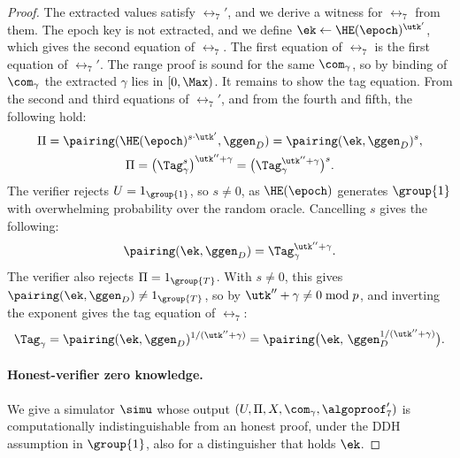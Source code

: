 \begin{proof}
  The extracted values satisfy $\rel_7'$, and we derive a witness for $\rel_7$
from them. The epoch key is not extracted, and we define $\ek \leftarrow
\HE(\epoch)^{\utk'}$, which gives the second equation of $\rel_7$. The first
equation of $\rel_7$ is the first equation of $\rel_7'$. The range proof is
sound for the same $\com_\gamma$, so by binding of $\com_\gamma$ the extracted
$\gamma$ lies in $[0,\Max)$. It remains to show the tag equation. From the
second and third equations of $\rel_7'$, and from the fourth and fifth, the
following hold:
  \begin{gather*}
    \Pi = \pairing(\HE(\epoch)^{s\cdot\utk'},\ggen_D) = \pairing(\ek,
\ggen_D)^{s}, \\ \Pi = \big(\Tag_\gamma^{s}\big)^{\utk''+\gamma} =
\big(\Tag_\gamma^{\utk''+\gamma}\big)^{s}.
  \end{gather*}
  The verifier rejects $U = 1_{\group{1}}$, so $s \neq 0$, as $\HE(\epoch)$
generates $\group{1}$ with overwhelming probability over the random oracle.
Cancelling $s$ gives the following:
  \begin{equation}\label{eq:rel7prime-core}
    \pairing(\ek, \ggen_D) = \Tag_\gamma^{\utk''+\gamma}.
  \end{equation}
  The verifier also rejects $\Pi = 1_{\group{T}}$. With $s \neq 0$, this gives
$\pairing(\ek,\ggen_D) \neq 1_{\group{T}}$, so by 
$\utk'' + \gamma \neq 0 \bmod p$, and inverting the exponent gives the tag
equation of $\rel_7$:
  \begin{equation*}
    \Tag_\gamma = \pairing(\ek,\ggen_D)^{1/(\utk''+\gamma)} =
\pairing\big(\ek,\, \ggen_D^{1/(\utk''+\gamma)}\big).
  \end{equation*}

  \paragraph{Honest-verifier zero knowledge.} We give a simulator $\simu$ whose
output $(U, \Pi, X,\allowbreak \com_\gamma,\allowbreak \algoproof_7')$ is computationally
indistinguishable from an honest proof, under the DDH assumption in $\group{1}$,
also for a distinguisher that holds $\ek$.


\end{proof}
